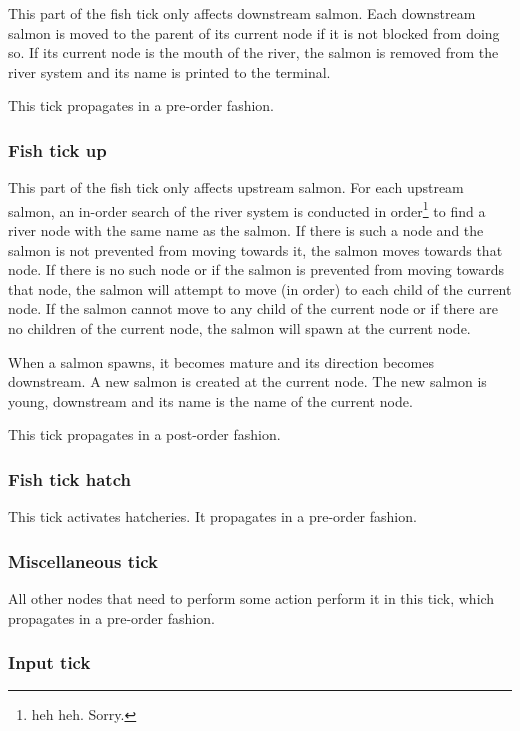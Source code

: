 \documentclass[10pt]{article}
\begin{document}
This part of the fish tick only affects downstream salmon. Each downstream salmon is moved to the parent of its current
node if it is not blocked from doing so. If its current node is the mouth of the river, the salmon is removed from the
river system and its name is printed to the terminal.

This tick propagates in a pre-order fashion.

\subsubsection{Fish tick up}

This part of the fish tick only affects upstream salmon. For each upstream salmon, an in-order search of the river system
is conducted in order\footnote{heh heh. Sorry.} to find a river node with the same name as the salmon. If there is such
a node and the salmon is not prevented from moving towards it, the salmon moves towards that node. If there is no such node
or if the salmon is prevented from moving towards that node, the salmon will attempt to move (in order) to each child of
the current node. If the salmon cannot move to any child of the current node or if there are no children of the current
node, the salmon will spawn at the current node.

When a salmon spawns, it becomes mature and its direction becomes downstream. A new salmon is created at the current node.
The new salmon is young, downstream and its name is the name of the current node.

This tick propagates in a post-order fashion.

\subsubsection{Fish tick hatch}

This tick activates hatcheries. It propagates in a pre-order fashion.

\subsubsection{Miscellaneous tick}

All other nodes that need to perform some action perform it in this tick, which propagates in a pre-order fashion.

\subsubsection{Input tick}
\end{document}
